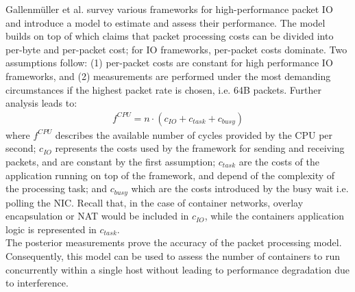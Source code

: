 \documentclass[conference]{IEEEtran}
\begin{document}
Gallenmüller et al. \cite{ANCS:Gallenmüller} survey various frameworks for high-performance packet IO and introduce a model to estimate and assess their performance. The model builds on top of \cite{Rizzo:2012} which claims that packet processing costs can be divided into per-byte and per-packet cost; for IO frameworks, per-packet costs dominate. Two assumptions follow: (1) per-packet costs are constant for high performance IO frameworks, and (2) measurements are performed under the most demanding circumstances if the highest packet rate is chosen, i.e. 64B packets. Further analysis leads to:
\begin{align}
f^{CPU} = n \cdot (c_{IO}+c_{task}+c_{busy})
\end{align}
\noindent where $f^{CPU}$ describes the available number of cycles provided by the CPU per second; $c_{IO}$ represents the costs used by the framework for sending and receiving packets, and are constant by the first assumption; $c_{task}$ are the costs of the application running on top of the framework, and depend of the complexity of the processing task; and $c_{busy}$ which are the costs introduced by the busy wait i.e. polling the NIC. Recall that, in the case of container networks, overlay encapsulation or NAT would be included in 
$c_{IO}$, while the containers application logic is represented in $c_{task}$.\\
The posterior measurements prove the accuracy of the packet processing model. Consequently, this model can be used to assess the number of containers to run concurrently within a single host without leading to performance degradation due to interference.
\end{document}
